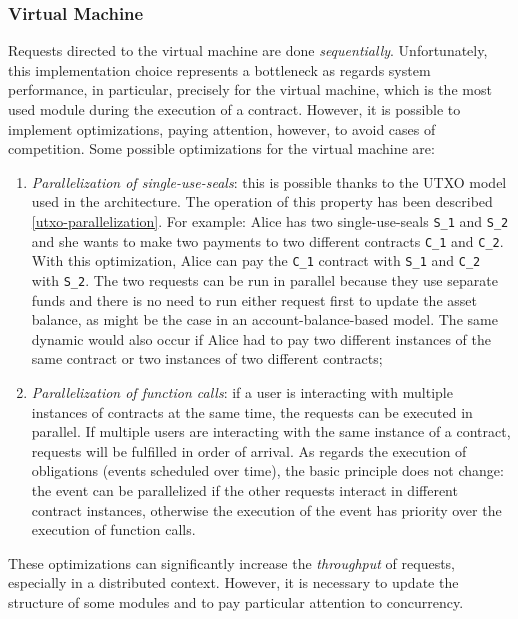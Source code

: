 \subsubsection{Virtual Machine}

Requests directed to the virtual machine are done \textit{sequentially}. Unfortunately, this implementation 
choice represents a bottleneck as regards system performance, in particular, precisely for the virtual 
machine, which is the most used module during the execution of a contract. However, it is possible to 
implement optimizations, paying attention, however, to avoid cases of competition. Some possible 
optimizations for the virtual machine are:
\begin{enumerate}
  \item \textit{Parallelization of single-use-seals}: this is possible thanks to the UTXO model used in the 
  architecture. The operation of this property has been described \ref{utxo-parallelization}. For example: 
  Alice has two single-use-seals \verb|S_1| and \verb|S_2| and she wants to make two payments to two 
  different contracts \verb|C_1| and \verb|C_2|. With this optimization, Alice can pay the \verb|C_1| 
  contract with \verb|S_1| and \verb|C_2| with \verb|S_2|. The two requests can be run in parallel because 
  they use separate funds and there is no need to run either request first to update the asset balance, as 
  might be the case in an account-balance-based model. The same dynamic would also occur if Alice had to 
  pay two different instances of the same contract or two instances of two different contracts;
  \item \textit{Parallelization of function calls}: if a user is interacting with multiple instances of 
  contracts at the same time, the requests can be executed in parallel. If multiple users are interacting 
  with the same instance of a contract, requests will be fulfilled in order of arrival. As regards the 
  execution of obligations (events scheduled over time), the basic principle does not change: the event 
  can be parallelized if the other requests interact in different contract instances, otherwise the 
  execution of the event has priority over the execution of function calls.
\end{enumerate}

These optimizations can significantly increase the \textit{throughput} of requests, especially in a 
distributed context. However, it is necessary to update the structure of some modules and to pay particular 
attention to concurrency.

